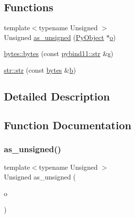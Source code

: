 \subsection*{Functions}
\begin{DoxyCompactItemize}
\item 
{\footnotesize template$<$typename Unsigned $>$ }\\Unsigned \mbox{\hyperlink{group__pytypes_ga5cf5177f54cd2d3a17326b8a729417a1}{as\+\_\+unsigned}} (\mbox{\hyperlink{_python27_2object_8h_aadc84ac7aed2cfa6f20c25f62bf3dac7}{Py\+Object}} $\ast$\mbox{\hyperlink{abstract_8h_a70a0763575096c5545f2232a32ec302a}{o}})
\item 
\mbox{\hyperlink{group__pytypes_ga7315ac2686b4e6120790815f31e28edc}{bytes\+::bytes}} (const \mbox{\hyperlink{node_8h_a62b34ca1362fe946082b7aa0cd9be844}{pybind11\+::str}} \&\mbox{\hyperlink{_s_d_l__opengl_8h_a4af680a6c683f88ed67b76f207f2e6e4}{s}})
\item 
\mbox{\hyperlink{group__pytypes_gad58fa3b0ad77f0cac09c65772c8116bb}{str\+::str}} (const \mbox{\hyperlink{classbytes}{bytes}} \&\mbox{\hyperlink{_s_d_l__opengl__glext_8h_a0f71581a41fd2264c8944126dabbd010}{b}})
\end{DoxyCompactItemize}


\subsection{Detailed Description}


\subsection{Function Documentation}
\mbox{\label{group__pytypes_ga5cf5177f54cd2d3a17326b8a729417a1}} 
\subsubsection{\texorpdfstring{as\_unsigned()}{as\_unsigned()}}
{\footnotesize\ttfamily template$<$typename Unsigned $>$ \\
Unsigned as\+\_\+unsigned (\begin{DoxyParamCaption}\item[{\mbox{\hyperlink{_python27_2object_8h_aadc84ac7aed2cfa6f20c25f62bf3dac7}{Py\+Object}} $\ast$}]{o }\end{DoxyParamCaption})}

